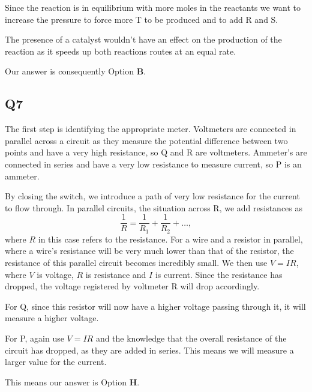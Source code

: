 \documentclass[11pt]{article}
\begin{document}
Since the reaction is in equilibrium with more moles in the reactants we want to increase the pressure to force more T to be produced and to add R and S.  

The presence of a catalyst wouldn't have an effect on the production of the reaction as it speeds up both reactions routes at an equal rate.  

Our answer is consequently Option \textbf{B}.

\subsection*{Q7}
The first step is identifying the appropriate meter.  Voltmeters are connected in parallel across a circuit as they measure the potential difference between two points and have a very high resistance, so Q and R are voltmeters.  Ammeter's are connected in series and have a very low resistance to measure current, so P is an ammeter.

By closing the switch, we introduce a path of very low resistance for the current to flow through.  In parallel circuits, the situation across R, we add resistances as
\begin{equation*}
\frac{1}{R} = \frac{1}{R_1} + \frac{1}{R_2} + \dots,
\end{equation*}
where $R$ in this case refers to the resistance.  For a wire and a resistor in parallel, where a wire's resistance will be very much lower than that of the resistor, the resistance of this parallel circuit becomes incredibly small.  We then use $V=IR$, where $V$ is voltage, $R$ is resistance and $I$ is current.  Since the resistance has dropped, the voltage registered by voltmeter R will drop accordingly.

For Q, since this resistor will now have a higher voltage passing through it, it will measure a higher voltage.

For P, again use $V=IR$ and the knowledge that the overall resistance of the circuit has dropped, as they are added in series.  This means we will measure a larger value for the current.

This means our answer is Option \textbf{H}.
\end{document}
